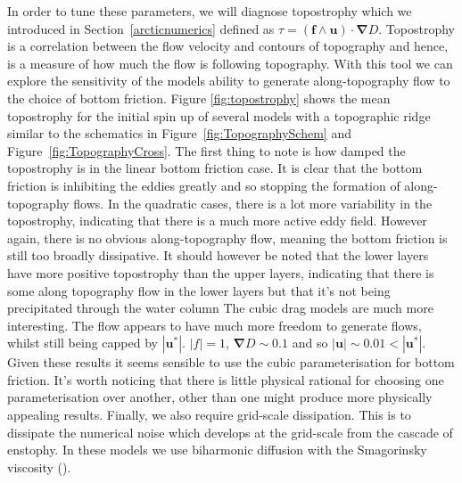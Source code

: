 \documentclass[12pt,a4paper]{report}
\newcommand*\figref[1]{Figure~\ref{#1}}
\newcommand*\secref[1]{Section~\ref{#1}}
\begin{document}
  In order to tune these parameters, we will diagnose
  topostrophy which we introduced in \secref{arcticnumerics}
  defined as
  $\tau = \left(\boldsymbol{ f } \wedge
  \boldsymbol{ u } \right) \cdot \boldsymbol{\nabla} D $. 
  Topostrophy is a correlation between the flow velocity
  and contours of topography and hence, is a measure of how much the flow is
  following topography. With this tool we can explore the sensitivity of the models
  ability to generate along-topography flow to the choice of bottom friction. 
  Figure \ref{fig:topostrophy} shows the mean topostrophy for the
  initial spin up of several models with a topographic ridge similar to
  the schematics in \figref{fig:TopographySchem} and
	\figref{fig:TopographyCross}. The first thing to note is how damped the 
  topostrophy is in the linear
  bottom friction case. It is clear that the bottom friction is inhibiting the 
  eddies greatly and so stopping the formation of along-topography flows. In
  the quadratic cases, there is a lot more variability in the topostrophy, indicating
  that there is a much more active eddy field. However again, there is no obvious
  along-topography flow, meaning the bottom friction is still too broadly dissipative.
  It should however be noted that the lower layers have more positive topostrophy than
  the upper layers, indicating that there is some along topography flow in the lower 
  layers but that it's not being precipitated  through the water column
  The cubic drag models are much more interesting. The flow appears to have much more
  freedom to generate flows, whilst still being capped by $\left|\boldsymbol{u}^{\ast}\right|$. $\left|f\right| = 1$, $\boldsymbol{\nabla} D \sim 0.1$ and so $\left|\boldsymbol{u}\right| \sim 0.01 < \left|\boldsymbol{u}^{\ast}\right|$.
  Given these results it seems sensible to use the cubic parameterisation for bottom 
  friction. It's worth noticing that there is little physical rational for choosing
  one parameterisation over another, other than one might produce more physically 
  appealing results. Finally, we also require grid-scale dissipation. This is to dissipate the
  numerical noise which develops at the grid-scale from the cascade of enstophy.
  In these models we use biharmonic diffusion with the Smagorinsky viscosity (\cite{smagorinsky1963general}). 
  
\end{document}

